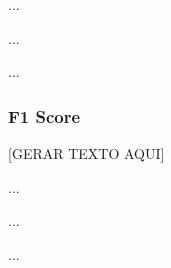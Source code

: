             ...
            
            ...

            ...
        
            \subsubsection{F1 Score}
            
                
                [GERAR TEXTO AQUI]

                ...

                ...

                ...
                

